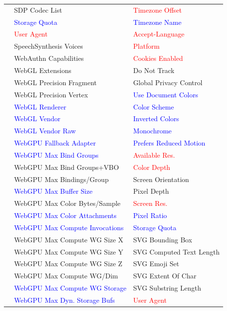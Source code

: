 {\begin{longtable}{l | l | l}
 & SDP Codec List & \textcolor{red}{Timezone Offset} \\
 & \textcolor{blue}{Storage Quota} & \textcolor{blue}{Timezone Name} \\
 & \textcolor{red}{User Agent} & \textcolor{red}{Accept-Language} \\
 & SpeechSynthesis Voices & \textcolor{red}{Platform} \\
 & WebAuthn Capabilities & \textcolor{red}{Cookies Enabled} \\
 & WebGL Extensions & Do Not Track \\
 & WebGL Precision Fragment & Global Privacy Control \\
 & WebGL Precision Vertex & \textcolor{blue}{Use Document Colors} \\
 & \textcolor{blue}{WebGL Renderer} & \textcolor{blue}{Color Scheme} \\
 & \textcolor{blue}{WebGL Vendor} & \textcolor{blue}{Inverted Colors} \\
 & \textcolor{blue}{WebGL Vendor Raw} & \textcolor{blue}{Monochrome} \\
 & \textcolor{blue}{WebGPU Fallback Adapter} & \textcolor{blue}{Prefers Reduced Motion} \\
 & \textcolor{blue}{WebGPU Max Bind Groups} & \textcolor{red}{Available Res.} \\
 & WebGPU Max Bind Groups+VBO & \textcolor{red}{Color Depth} \\
 & WebGPU Max Bindings/Group & Screen Orientation \\
 & \textcolor{blue}{WebGPU Max Buffer Size} & Pixel Depth \\
 & WebGPU Max Color Bytes/Sample & \textcolor{red}{Screen Res.} \\
 & \textcolor{blue}{WebGPU Max Color Attachments} & \textcolor{blue}{Pixel Ratio} \\
 & \textcolor{blue}{WebGPU Max Compute Invocations} & \textcolor{blue}{Storage Quota} \\
 & WebGPU Max Compute WG Size X & SVG Bounding Box \\
 & WebGPU Max Compute WG Size Y & SVG Computed Text Length \\
 & WebGPU Max Compute WG Size Z & SVG Emoji Set \\
 & WebGPU Max Compute WG/Dim & SVG Extent Of Char \\
 & \textcolor{blue}{WebGPU Max Compute WG Storage} & SVG Substring Length \\
 & \textcolor{blue}{WebGPU Max Dyn. Storage Bufs} & \textcolor{red}{User Agent} \\

\end{longtable}}

